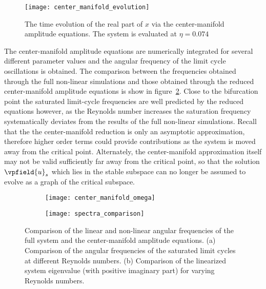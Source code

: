 \begin{figure}
	\centering
	\texttt{[image: center\_manifold\_evolution]}	
	\caption{The time evolution of the real part of $x$ via the center-manifold amplitude equations. The system is evaluated at $\eta=0.074$}
	\label{fig:center_manifold_evolution}
\end{figure}
The center-manifold amplitude equations are numerically integrated for several different parameter values and the angular frequency of the limit cycle oscillations is obtained. The comparison between the frequencies obtained through the full non-linear simulations and those obtained through the reduced center-manifold amplitude equations is show in figure~\ref{fig:limit_cycle_frequency}. Close to the bifurcation point the saturated limit-cycle frequencies are well predicted by the reduced equations however, as the Reynolds number increases the saturation frequency systematically deviates from the results of the full non-linear simulations. Recall that the the center-manifold reduction is only an asymptotic approximation, therefore higher order terms could provide contributions as the system is moved away from the critical point. Alternately, the center-manifold approximation itself may not be valid sufficiently far away from the critical point, so that the solution $\vpfield{u}_{s}$ which lies in the stable subspace can no longer be assumed to evolve as a graph of the critical subspace. 
\begin{figure}
	\centering
	\begin{subfigure}[t]{0.49\textwidth}
		\texttt{[image: center\_manifold\_omega]}
		\caption{}
		\label{fig:limit_cycle_frequency}
	\end{subfigure}	
	\begin{subfigure}[t]{0.49\textwidth}
		\texttt{[image: spectra\_comparison]}
		\caption{}
		\label{fig:linearized_eigenvalue}
	\end{subfigure}									
	\caption{Comparison of the linear and non-linear angular frequencies of the full system and the center-manifold amplitude equations. (a) Comparison of the angular frequencies of the saturated limit cycles at different Reynolds numbers. (b) Comparison of the linearized system eigenvalue (with positive imaginary part) for varying Reynolds numbers.}
	\label{fig:frequency_comparison}
\end{figure}

